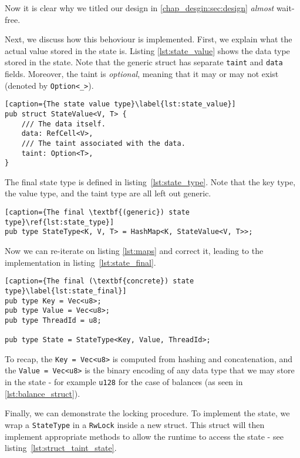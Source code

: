 \begin{remark}
	Now it is clear why we titled our design in \ref{chap_desgin:sec:design} \textit{almost}
	wait-free.
\end{remark}

Next, we discuss how this behoviour is implemented. First, we explain what the actual value stored in the
state is. Listing \ref{lst:state_value} shows the data type stored in the state. Note that the generic struct has
separate \texttt{taint} and \texttt{data} fields. Moreover, the taint is \textit{optional}, meaning
that it may or may not exist (denoted by \texttt{Option<\_>}).

\begin{lstlisting}[caption={The state value type}\label{lst:state_value}]
pub struct StateValue<V, T> {
	/// The data itself.
	data: RefCell<V>,
	/// The taint associated with the data.
	taint: Option<T>,
}
\end{lstlisting}

The final state type is defined in listing~\ref{lst:state_type}. Note that the key type, the value type, and the taint type are all left out generic.

\begin{lstlisting}[caption={The final \textbf{(generic}) state type}\ref{lst:state_type}]
pub type StateType<K, V, T> = HashMap<K, StateValue<V, T>>;
\end{lstlisting}

Now we can re-iterate on listing \ref{lst:maps} and correct it, leading to the implementation in listing~\ref{lst:state_final}.
\begin{lstlisting}[caption={The final (\textbf{concrete}) state type}\label{lst:state_final}]
pub type Key = Vec<u8>;
pub type Value = Vec<u8>;
pub type ThreadId = u8;

pub type State = StateType<Key, Value, ThreadId>;
\end{lstlisting}

To recap, the \texttt{Key = Vec<u8>} is computed from hashing and concatenation, and the
\texttt{Value = Vec<u8>} is the binary encoding of any data type that we may store in the state - for
example \texttt{u128} for the case of balances (as seen in \ref{lst:balance_struct}).

Finally, we can demonstrate the locking procedure. To implement the state, we wrap a
\texttt{StateType} in a \texttt{RwLock} inside a new struct.
This struct will then implement appropriate methods to allow the runtime to access the state - see listing~\ref{lst:struct_taint_state}.

